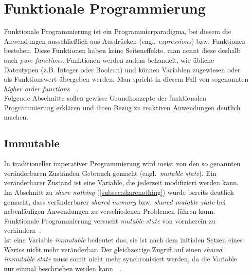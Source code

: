 \section{Funktionale Programmierung}
Funktionale Programmierung ist ein Programmierparadigma, bei diesem die Anwendungen ausschließlich aus Ausdrücken (engl. \textit{expressions}) bzw. Funktionen bestehen. Diese Funktionen haben keine Seiteneffekte, man nennt diese deshalb auch \textit{pure functions}. Funktionen werden zudem behandelt, wie übliche Datentypen (z.B. Integer oder Boolean) und können Variablen zugewiesen oder als Funktionswert übergeben werden. Man spricht in diesem Fall von sogenannten \textit{higher order functions}~\cite[S.~50]{butcher_seven_2014}~\cite[S.~3~\&~S.~19]{chiusano_functional_2015}.\\
Folgende Abschnitte sollen gewisse Grundkonzepte der funktionalen Programmierung erklären und ihren Bezug zu reaktiven Anwendungen deutlich machen. 

\subsection{Immutable}
In traditioneller imperativer Programmierung wird meist von den so genannten veränderbaren Zuständen Gebrauch gemacht (engl.~\textit{mutable state}). Ein veränderbarer Zustand ist eine Variable, die jederzeit modifiziert werden kann. Im Abschnitt zu \textit{share nothing} (\ref{subsec:sharenothing}) wurde bereits deutlich gemacht, dass veränderbarer \textit{shared memory} bzw. \textit{shared mutable state} bei nebenläufigen Anwendungen zu verschiedenen Problemen führen kann. Funktionale Programmierung versucht \textit{mutable state} von vornherein zu verhindern~\cite[S.~50]{butcher_seven_2014}.\\
Ist eine Variable \textit{immutable} bedeutet das, sie ist nach dem initialen Setzen eines Wertes nicht mehr veränderbar. Der gleichzeitige Zugriff auf einen \textit{shared immutable state} muss somit nicht mehr synchronisiert werden, da die Variable nur einmal beschrieben werden kann~\cite[S.~50]{butcher_seven_2014}~\cite[S.~62]{kuhn_reactive_2015}.

\pagebreak

